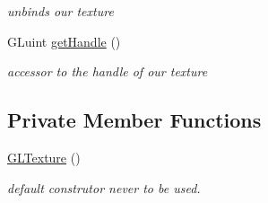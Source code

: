 \begin{DoxyCompactItemize}
\begin{DoxyCompactList}\small\item\em unbinds our texture \end{DoxyCompactList}\item 
\hypertarget{class_g_l_texture_a0232aa38a299d2570a06367cd8ebd688}{G\-Luint \hyperlink{class_g_l_texture_a0232aa38a299d2570a06367cd8ebd688}{get\-Handle} ()}\label{class_g_l_texture_a0232aa38a299d2570a06367cd8ebd688}

\begin{DoxyCompactList}\small\item\em accessor to the handle of our texture \end{DoxyCompactList}\end{DoxyCompactItemize}
\subsection*{Private Member Functions}
\begin{DoxyCompactItemize}
\item 
\hypertarget{class_g_l_texture_abb3da94e96ea6893e33e51c5422a42f9}{\hyperlink{class_g_l_texture_abb3da94e96ea6893e33e51c5422a42f9}{G\-L\-Texture} ()}\label{class_g_l_texture_abb3da94e96ea6893e33e51c5422a42f9}

\begin{DoxyCompactList}\small\item\em default construtor never to be used. \end{DoxyCompactList}\end{DoxyCompactItemize}
